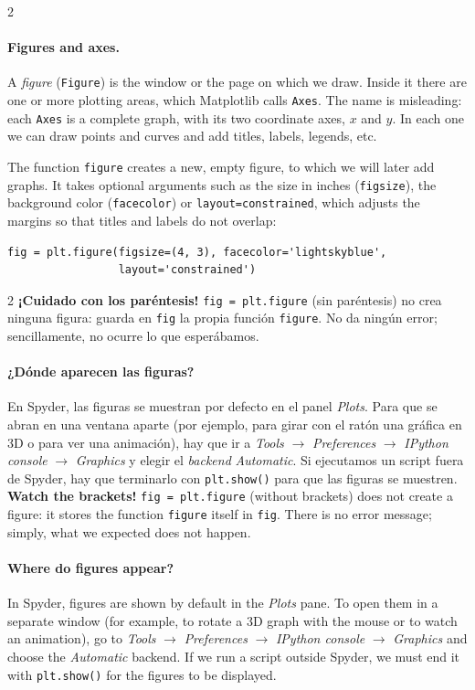 \begin{paracol}{2}
\paragraph{Figures and axes.} A \emph{figure} (\texttt{Figure}) is the window or the page on which we draw. Inside it there are one or more plotting areas, which Matplotlib calls \texttt{Axes}. The name is misleading: each \texttt{Axes} is a complete graph, with its two coordinate axes, $x$ and $y$. In each one we can draw points and curves and add titles, labels, legends, etc.

The function \texttt{figure} creates a new, empty figure, to which we will later add graphs. It takes optional arguments such as the size in inches (\texttt{figsize}), the background color (\texttt{facecolor}) or \texttt{layout=\textquotesingle{}constrained\textquotesingle{}}, which adjusts the margins so that titles and labels do not overlap:
\end{paracol}

\begin{verbatim}
fig = plt.figure(figsize=(4, 3), facecolor='lightskyblue',
                 layout='constrained')
\end{verbatim}

\begin{paracol}{2}
\textbf{¡Cuidado con los paréntesis!} \texttt{fig = plt.figure} (sin paréntesis) no crea ninguna figura: guarda en \texttt{fig} la propia función \texttt{figure}. No da ningún error; sencillamente, no ocurre lo que esperábamos.

\paragraph{¿Dónde aparecen las figuras?} En Spyder, las figuras se muestran por defecto en el panel \emph{Plots}. Para que se abran en una ventana aparte (por ejemplo, para girar con el ratón una gráfica en 3D o para ver una animación), hay que ir a \emph{Tools} $\rightarrow$ \emph{Preferences} $\rightarrow$ \emph{IPython console} $\rightarrow$ \emph{Graphics} y elegir el \emph{backend} \emph{Automatic}. Si ejecutamos un script fuera de Spyder, hay que terminarlo con \texttt{plt.show()} para que las figuras se muestren.
\switchcolumn
\textbf{Watch the brackets!} \texttt{fig = plt.figure} (without brackets) does not create a figure: it stores the function \texttt{figure} itself in \texttt{fig}. There is no error message; simply, what we expected does not happen.

\paragraph{Where do figures appear?} In Spyder, figures are shown by default in the \emph{Plots} pane. To open them in a separate window (for example, to rotate a 3D graph with the mouse or to watch an animation), go to \emph{Tools} $\rightarrow$ \emph{Preferences} $\rightarrow$ \emph{IPython console} $\rightarrow$ \emph{Graphics} and choose the \emph{Automatic} backend. If we run a script outside Spyder, we must end it with \texttt{plt.show()} for the figures to be displayed.
\end{paracol}

